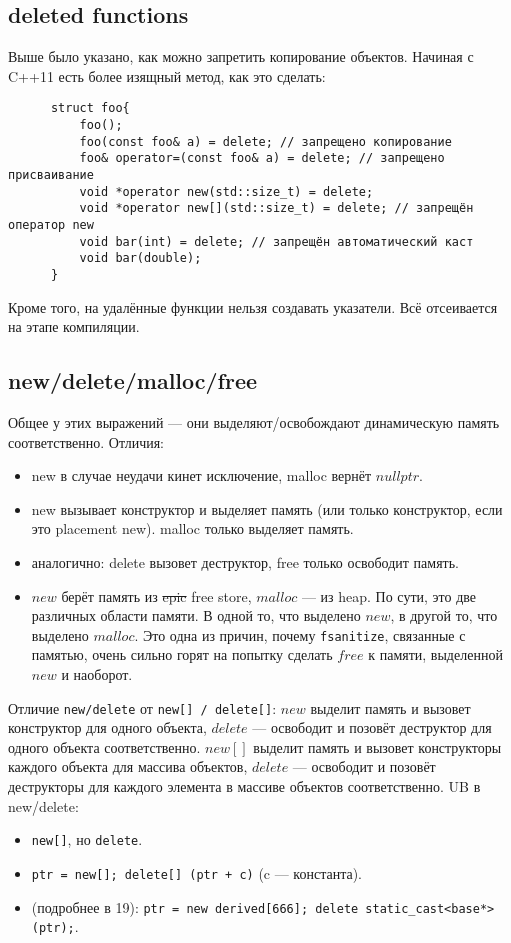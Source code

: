 \documentclass[15pt, a4paper]{article}
\newcommand{\nl}{\newline}
\begin{document}
  \subsection{deleted functions}
  Выше было указано, как можно запретить копирование объектов. Начиная с C++11 есть более изящный метод, как это сделать:
  \begin{verbatim}
      struct foo{
          foo();
          foo(const foo& a) = delete; // запрещено копирование
          foo& operator=(const foo& a) = delete; // запрещено присваивание
          void *operator new(std::size_t) = delete;
          void *operator new[](std::size_t) = delete; // запрещён оператор new
          void bar(int) = delete; // запрещён автоматический каст
          void bar(double);
      }
  \end{verbatim}
  Кроме того, на удалённые функции нельзя создавать указатели. Всё отсеивается на этапе компиляции.
  \subsection{new/delete/malloc/free}
  Общее у этих выражений --- они выделяют/освобождают динамическую память соответственно. Отличия:
  \begin{itemize}
      \item new в случае неудачи кинет исключение, malloc вернёт $nullptr$.
      \item new вызывает конструктор и выделяет память (или только конструктор, если это placement new). malloc только выделяет память.
      \item аналогично: delete вызовет деструктор, free только освободит память.
      \item $new$ берёт память из \sout{epic} free store, $malloc$ --- из heap. По сути, это две различных области памяти. В одной то, что выделено $new$, в другой то, что выделено $malloc$.
      Это одна из причин, почему \texttt{fsanitize}, связанные с памятью, очень сильно горят на попытку сделать $free$ к памяти, выделенной $new$ и наоборот.
  \end{itemize}
  Отличие \texttt{new/delete} от \texttt{new[] / delete[]}: \nl
  $new$ выделит память и вызовет конструктор для одного объекта, $delete$ --- освободит и позовёт деструктор для одного объекта соответственно. \nl
  $new[]$ выделит память и вызовет конструкторы каждого объекта для массива объектов, $delete$ --- освободит и позовёт деструкторы для каждого элемента в массиве объектов соответственно. \nl
  \newpage
  UB в new/delete:
  \begin{itemize}
      \item \texttt{new[]}, но \texttt{delete}.
      \item \texttt{ptr = new[]; delete[] (ptr + c)} (c --- константа).
      \item (подробнее в 19): \texttt{ptr = new derived[666]; delete static\_cast<base*>(ptr);}.
  \end{itemize}
\end{document}
